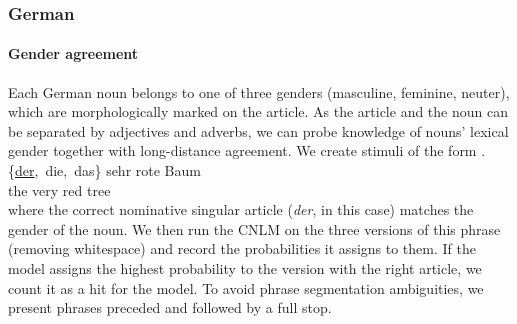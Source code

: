 \subsubsection{German}%


\paragraph{Gender agreement}
Each German noun belongs to one of three genders (masculine, feminine, neuter), which are morphologically marked on the article. As the article and the noun can be separated by adjectives and adverbs, we can probe knowledge of nouns' lexical gender together with long-distance agreement.
We create stimuli of the form
\exg. \{\underline{der},\ die,\ das\} sehr rote Baum \\
the very red tree \\

where the correct nominative singular article (\emph{der}, in this case) matches the gender of the noun.
We then run the CNLM on the three versions of this phrase (removing whitespace) and record the probabilities it assigns to them. If the model assigns the highest probability to the version with the right article, we count it as a hit for the model. To avoid phrase segmentation ambiguities, we present phrases preceded and followed by a full stop.

